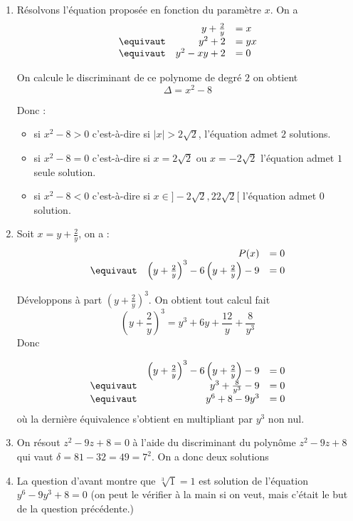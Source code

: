 \begin{correction}
\begin{enumerate}
\item Résolvons l'équation proposée en fonction du paramètre $x$. 
On a $$
\begin{array}{lrl}
&y+\frac{2}{y}&=x\\
\equivaut & y^2+2&=yx\\
\equivaut & y^2-xy+2&=0
\end{array}
$$

On calcule le discriminant de ce polynome de degré $2$ on obtient
$$\Delta = x^2-8$$

Donc : 
\begin{itemize}
\item si $x^2-8>0$  c'est-à-dire si  $|x| >2\sqrt{2}$, 
l'équation admet $2$ solutions. 
\item si $x^2-8=0$  c'est-à-dire si  $x=2\sqrt{2}$ ou $x=-2\sqrt{2}$ 
l'équation admet $1$ seule solution. 
\item si $x^2-8<0$  c'est-à-dire si  $x\in ]-2\sqrt{2},22\sqrt{2}[$ 
l'équation admet $0$ solution. 
\end{itemize}

\item 
Soit $x=y+\frac{2}{y}$, on a :
$$\begin{array}{lrl}
&P(x)&=0 \\
\equivaut&\left(y+ \frac{2}{y}\right)^3-6\left(y+ \frac{2}{y}\right)-9&=0
\end{array}
$$

Développons à part 
$\left(y+ \frac{2}{y}\right)^3$. On obtient tout calcul fait
$$\left(y+ \frac{2}{y}\right)^3=y^3 +6y+\frac{12}{y}+\frac{8}{y^3}$$
Donc 

$$\begin{array}{lrl}
&\left(y+ \frac{2}{y}\right)^3-6\left(y+ \frac{2}{y}\right)-9&=0\\
\equivaut& y^3 +\frac{8}{y^3}-9&=0\\
\equivaut& y^6 +8-9y^3&=0
\end{array}
$$
où la dernière équivalence s'obtient en multipliant par $y^3$ non nul. 

\item On résout $z^2-9z+8=0$ à l'aide du discriminant du polynôme $z^2-9z+8$ qui vaut 
$\delta = 81-32= 49=7^2$. On  a donc deux solutions 

\item La question d'avant montre que $\sqrt[3]{1}=1$ est solution de l'équation $y^6-9y^3+8=0$ (on peut le vérifier à la main si on veut, mais c'était le but de la question précédente.) 


\end{enumerate}
\end{correction}
